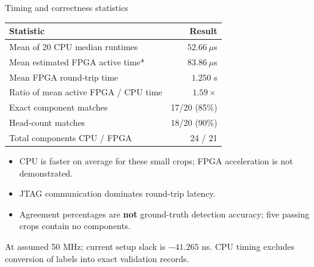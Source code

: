 \documentclass[aspectratio=169,10pt]{beamer}
\begin{document}
\begin{frame}{Timing and correctness statistics}
\begin{center}
\begin{tabular}{lr}
\toprule
\textbf{Statistic} & \textbf{Result} \\
\midrule
Mean of 20 CPU median runtimes & $52.66\ \mu$s \\
Mean estimated FPGA active time* & $83.86\ \mu$s \\
Mean FPGA round-trip time & $1.250$ s \\
Ratio of mean active FPGA / CPU time & $1.59\times$ \\
Exact component matches & 17/20 (85\%) \\
Head-count matches & 18/20 (90\%) \\
Total components CPU / FPGA & 24 / 21 \\
\bottomrule
\end{tabular}
\end{center}
\begin{itemize}
\item CPU is faster on average for these small crops; FPGA acceleration is not demonstrated.
\item JTAG communication dominates round-trip latency.
\item Agreement percentages are \textbf{not} ground-truth detection accuracy; five passing crops contain no components.
\end{itemize}
\scriptsize *At assumed 50 MHz; current setup slack is $-41.265$ ns. CPU timing excludes conversion of labels into exact validation records.
\end{frame}
\end{document}
